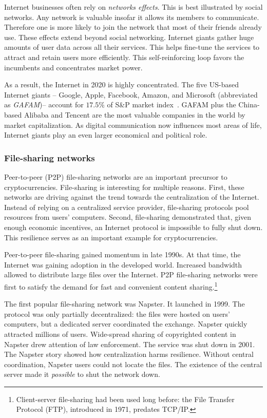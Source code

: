 Internet businesses often rely on \textit{networks effects}.
This is best illustrated by social networks.
Any network is valuable insofar it allows its members to communicate.
Therefore one is more likely to join the network that most of their friends already use.
These effects extend beyond social networking.
Internet giants gather huge amounts of user data across all their services.
This helps fine-tune the services to attract and retain users more efficiently.
This self-reinforcing loop favors the incumbents and concentrates market power.

As a result, the Internet in 2020 is highly concentrated.
The five US-based Internet giants -- Google, Apple, Facebook, Amazon, and Microsoft (abbreviated as \textit{GAFAM})-- account for $17.5$\% of S\&P market index~\cite{Levy2020}.
GAFAM plus the China-based Alibaba and Tencent are the most valuable companies in the world by market capitalization.
As digital communication now influences most areas of life, Internet giants play an even larger economical and political role.


\subsubsection*{File-sharing networks}
\label{sec:FileSharingNetworks}

Peer-to-peer (P2P) file-sharing networks are an important precursor to cryptocurrencies.
File-sharing is interesting for multiple reasons.
First, these networks are driving against the trend towards the centralization of the Internet.
Instead of relying on a centralized service provider, file-sharing protocols pool resources from users' computers.
Second, file-sharing demonstrated that, given enough economic incentives, an Internet protocol is impossible to fully shut down.
This resilience serves as an important example for cryptocurrencies.

Peer-to-peer file-sharing gained momentum in late 1990s.
At that time, the Internet was gaining adoption in the developed world.
Increased bandwidth allowed to distribute large files over the Internet.
P2P file-sharing networks were first to satisfy the demand for fast and convenient content sharing.\footnote{Client-server file-sharing had been used long before: the File Transfer Protocol (FTP), introduced in 1971,  predates TCP/IP.}

The first popular file-sharing network was Napster.
It launched in 1999.
The protocol was only partially decentralized: the files were hosted on users' computers, but a dedicated server coordinated the exchange.
Napster quickly attracted millions of users.
Wide-spread sharing of copyrighted content in Napster drew attention of law enforcement.
The service was shut down in 2001.
The Napster story showed how centralization harms resilience.
Without central coordination, Napster users could not locate the files.
The existence of the central server made it \textit{possible} to shut the network down.

